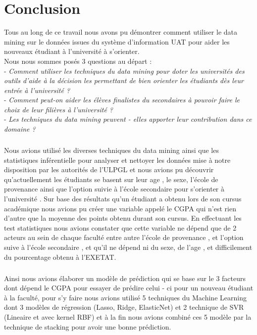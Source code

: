 \chapter*{Conclusion}
Tous au long de ce travail nous avons pu démontrer comment utiliser le data mining sur le données issues du système d'information \ac{UAT} pour aider les nouveaux étudiant à l'université à s'orienter.\\
Nous nous sommes posés 3 questions au départ : \\
- \emph{Comment utiliser les techniques  du data mining pour doter les universités des outils d'aide à la décision les permettant de bien orienter les étudiants dès leur entrée à l'université ?  }\\
- \emph{Comment peut-on aider les élèves finalistes du secondaires  à pouvoir faire le choix de leur filières à l'université ? }\\
- \emph{Les techniques du data mining peuvent - elles apporter leur contribution dans ce domaine ? }
\paragraph{}
Nous avions utilisé les diverses techniques du data mining ainsi que les statistiques inférentielle pour analyser  et nettoyer les données mise à notre disposition par les autorités de l'\ac{ULPGL} et nous avions pu découvrir qu'actuellement les étudiants se basent sur leur age , le sexe, l'école de provenance ainsi que l'option suivie à l'école secondaire pour s'orienter à l'université .
Sur base des résultats qu'un étudiant a obtenu lors de son cursus académique nous avions pu créer une variable appelé le \ac{CGPA}  qui  n'est rien d'autre que la moyenne des points obtenu durant son cursus. 
En effectuant les test statistiques nous avions constater que cette variable ne dépend  que de 2 acteurs au sein de chaque faculté entre autre l'école de provenance , et l'option suive à l'école secondaire , et qu'il ne dépend ni du sexe, de l'age , et difficilement du pourcentage obtenu à l'\ac{EXETAT}.
\paragraph{}
Ainsi nous avions élaborer un modèle de prédiction   qui se base sur le 3 facteurs dont dépend le CGPA pour essayer de prédire celui - ci pour un nouveau étudiant à la faculté, pour s'y faire nous avions utilisé 5 techniques du Machine Learning dont 3 modèles de régression (Lasso, Ridge, ElasticNet) et 2 technique de \ac{SVR} (Lineaire et avec kernel RBF)  et à la fin nous avions combiné ces 5 modèle par la technique de stacking pour avoir une bonne prédiction.

